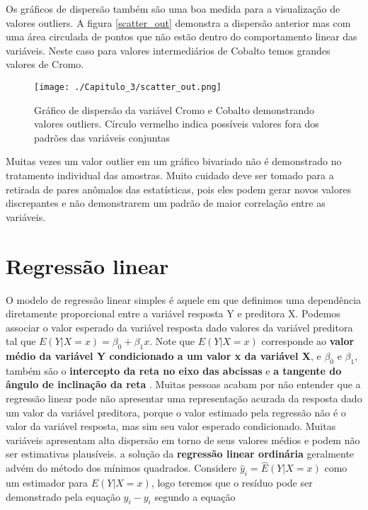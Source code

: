 Os gráficos de dispersão também são uma boa medida para a visualização de valores outliers. A figura \eqref{scatter_out} demonstra a dispersão anterior mas com uma área circulada de pontos que não estão dentro do comportamento linear das variáveis. Neste caso para valores intermediários de Cobalto temos grandes valores de Cromo.

 \begin{figure}[H]
 	\centering
 	\texttt{[image: ./Capitulo\_3/scatter\_out.png]}	
 	\caption{Gráfico de dispersão da variável Cromo e Cobalto demonstrando valores outliers. Círculo vermelho indica possíveis valores fora dos padrões das variáveis conjuntas }
 	\label{scatter_out}
 \end{figure} 
 
 Muitas vezes um valor outlier em um gráfico bivariado não é demonstrado no tratamento individual das amostras. Muito cuidado deve ser tomado para a retirada de pares anômalos das estatísticas, pois eles podem gerar novos valores discrepantes e não demonstrarem um padrão de maior correlação entre as variáveis.
 
     
  \section{Regressão linear }
  
  O modelo de regressão linear simples é aquele em que definimos uma dependência diretamente proporcional entre a variável resposta Y e preditora X. Podemos associar o valor esperado da variável resposta dado valores da variável preditora tal que $E(Y|X=x) = \beta_{0} + \beta_{1}x$. Note que $E(Y|X=x)$ corresponde ao \textbf{valor médio da variável Y condicionado a um valor x da variável X}, e $\beta_{0}$ e $\beta_{1}$, também são o \textbf{intercepto da reta no eixo das abcissas} e \textbf{a tangente do ângulo de inclinação da reta}  . Muitas pessoas acabam por não entender que a regressão linear pode não apresentar uma representação acurada da resposta dado um valor da variável preditora, porque o valor estimado pela regressão não é o valor da variável resposta, mas sim seu valor esperado condicionado. Muitas variáveis apresentam alta dispersão em torno de seus valores médios e podem não ser estimativas plausíveis. a solução da \textbf{regressão linear ordinária} geralmente advém do método dos mínimos quadrados. Considere $\hat{y}_{i}=\hat{E}(Y|X=x)$ como um estimador para $E(Y|X=x)$, logo teremos que o resíduo pode ser demonstrado pela equação  $\hat{y}_{i}-y_{i}$ segundo a equação   
 
